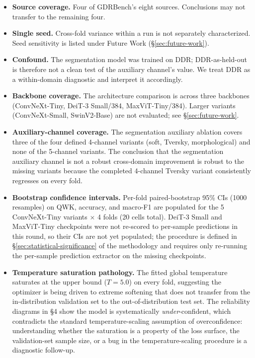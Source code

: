 \documentclass[11pt]{article}
\begin{document}
\begin{itemize}[leftmargin=*, topsep=0pt]
  \item \textbf{Source coverage.} Four of GDRBench's eight sources. Conclusions may not transfer to the remaining four.
  \item \textbf{Single seed.} Cross-fold variance within a run is not separately characterized. Seed sensitivity is listed under Future Work (\S\ref{sec:future-work}).
  \item \textbf{Confound.} The segmentation model was trained on DDR; DDR-as-held-out is therefore not a clean test of the auxiliary channel's value. We treat DDR as a within-domain diagnostic and interpret it accordingly.
  \item \textbf{Backbone coverage.} The architecture comparison is across three backbones (ConvNeXt-Tiny, DeiT-3 Small/384, MaxViT-Tiny/384). Larger variants (ConvNeXt-Small, SwinV2-Base) are not evaluated; see \S\ref{sec:future-work}.
  \item \textbf{Auxiliary-channel coverage.} The segmentation auxiliary ablation covers three of the four defined 4-channel variants (soft, Tversky, morphological) and none of the 5-channel variants. The conclusion that the segmentation auxiliary channel is not a robust cross-domain improvement is robust to the missing variants because the completed 4-channel Tversky variant consistently regresses on every fold.
  \item \textbf{Bootstrap confidence intervals.} Per-fold paired-bootstrap 95\% CIs (1000 resamples) on QWK, accuracy, and macro-F1 are populated for the 5 ConvNeXt-Tiny variants $\times$ 4 folds (20 cells total). DeiT-3 Small and MaxViT-Tiny checkpoints were not re-scored to per-sample predictions in this round, so their CIs are not yet populated; the procedure is defined in \S\ref{sec:statistical-significance} of the methodology and requires only re-running the per-sample prediction extractor on the missing checkpoints.
  \item \textbf{Temperature saturation pathology.} The fitted global temperature saturates at the upper bound ($T = 5.0$) on every fold, suggesting the optimizer is being driven to extreme softening that does not transfer from the in-distribution validation set to the out-of-distribution test set. The reliability diagrams in \S4 show the model is systematically \emph{under}-confident, which contradicts the standard temperature-scaling assumption of overconfidence: understanding whether the saturation is a property of the loss surface, the validation-set sample size, or a bug in the temperature-scaling procedure is a diagnostic follow-up.
\end{itemize}
\end{document}
